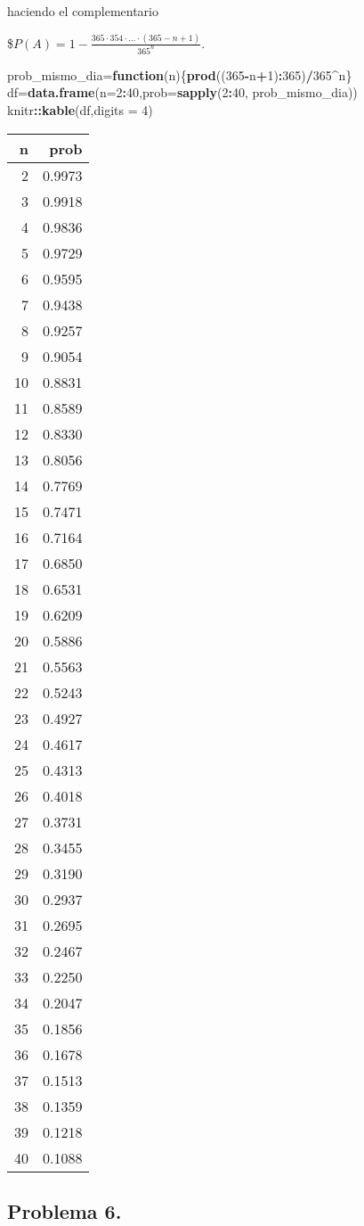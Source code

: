 \documentclass[
]{article}
\newenvironment{Shaded}{\begin{snugshade}}{\end{snugshade}}
\newcommand{\ControlFlowTok}[1]{\textcolor[rgb]{0.13,0.29,0.53}{\textbf{#1}}}
\newcommand{\DataTypeTok}[1]{\textcolor[rgb]{0.13,0.29,0.53}{#1}}
\newcommand{\DecValTok}[1]{\textcolor[rgb]{0.00,0.00,0.81}{#1}}
\newcommand{\KeywordTok}[1]{\textcolor[rgb]{0.13,0.29,0.53}{\textbf{#1}}}
\newcommand{\NormalTok}[1]{#1}
\newcommand{\OperatorTok}[1]{\textcolor[rgb]{0.81,0.36,0.00}{\textbf{#1}}}
\begin{document}
haciendo el complementario

\$\(P(A)=1-\frac{365\cdot 354\cdot \ldots\cdot (365-n+1) }{365^n}.\)

\begin{Shaded}
\begin{Highlighting}[]
\NormalTok{prob_mismo_dia=}\ControlFlowTok{function}\NormalTok{(n)\{}\KeywordTok{prod}\NormalTok{((}\DecValTok{365}\OperatorTok{-}\NormalTok{n}\OperatorTok{+}\DecValTok{1}\NormalTok{)}\OperatorTok{:}\DecValTok{365}\NormalTok{)}\OperatorTok{/}\DecValTok{365}\OperatorTok{^}\NormalTok{n\}}
\NormalTok{df=}\KeywordTok{data.frame}\NormalTok{(}\DataTypeTok{n=}\DecValTok{2}\OperatorTok{:}\DecValTok{40}\NormalTok{,}\DataTypeTok{prob=}\KeywordTok{sapply}\NormalTok{(}\DecValTok{2}\OperatorTok{:}\DecValTok{40}\NormalTok{, prob_mismo_dia))}
\NormalTok{knitr}\OperatorTok{::}\KeywordTok{kable}\NormalTok{(df,}\DataTypeTok{digits =} \DecValTok{4}\NormalTok{)}
\end{Highlighting}
\end{Shaded}

\begin{longtable}[]{@{}rr@{}}
\toprule
n & prob\tabularnewline
\midrule
\endhead
2 & 0.9973\tabularnewline
3 & 0.9918\tabularnewline
4 & 0.9836\tabularnewline
5 & 0.9729\tabularnewline
6 & 0.9595\tabularnewline
7 & 0.9438\tabularnewline
8 & 0.9257\tabularnewline
9 & 0.9054\tabularnewline
10 & 0.8831\tabularnewline
11 & 0.8589\tabularnewline
12 & 0.8330\tabularnewline
13 & 0.8056\tabularnewline
14 & 0.7769\tabularnewline
15 & 0.7471\tabularnewline
16 & 0.7164\tabularnewline
17 & 0.6850\tabularnewline
18 & 0.6531\tabularnewline
19 & 0.6209\tabularnewline
20 & 0.5886\tabularnewline
21 & 0.5563\tabularnewline
22 & 0.5243\tabularnewline
23 & 0.4927\tabularnewline
24 & 0.4617\tabularnewline
25 & 0.4313\tabularnewline
26 & 0.4018\tabularnewline
27 & 0.3731\tabularnewline
28 & 0.3455\tabularnewline
29 & 0.3190\tabularnewline
30 & 0.2937\tabularnewline
31 & 0.2695\tabularnewline
32 & 0.2467\tabularnewline
33 & 0.2250\tabularnewline
34 & 0.2047\tabularnewline
35 & 0.1856\tabularnewline
36 & 0.1678\tabularnewline
37 & 0.1513\tabularnewline
38 & 0.1359\tabularnewline
39 & 0.1218\tabularnewline
40 & 0.1088\tabularnewline
\bottomrule
\end{longtable}

\hypertarget{problema-6.}{%
\subsection{Problema 6.}\label{problema-6.}}
\end{document}
